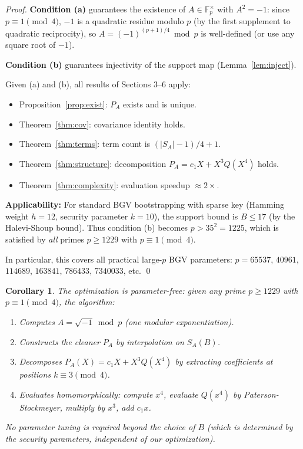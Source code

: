 \documentclass[11pt]{article}
\newtheorem{corollary}[theorem]{Corollary}
\newcommand{\Fp}{\mathbb{F}_p}
\begin{document}
\begin{proof}
\textbf{Condition (a)} guarantees the existence of $A \in \Fp^\times$ with $A^2 = -1$: since $p \equiv 1 \pmod 4$, $-1$ is a quadratic residue modulo $p$ (by the first supplement to quadratic reciprocity), so $A = (-1)^{(p+1)/4} \bmod p$ is well-defined (or use any square root of $-1$).

\textbf{Condition (b)} guarantees injectivity of the support map (Lemma~\ref{lem:inject}).

Given (a) and (b), all results of Sections 3--6 apply:
\begin{itemize}
\item Proposition~\ref{prop:exist}: $P_A$ exists and is unique.
\item Theorem~\ref{thm:cov}: covariance identity holds.
\item Theorem~\ref{thm:terms}: term count is $(|S_A|-1)/4 + 1$.
\item Theorem~\ref{thm:structure}: decomposition $P_A = c_1 X + X^3 Q(X^4)$ holds.
\item Theorem~\ref{thm:complexity}: evaluation speedup $\approx 2\times$.
\end{itemize}

\textbf{Applicability:} For standard BGV bootstrapping with sparse key (Hamming weight $h = 12$, security parameter $k = 10$), the support bound is $B \leq 17$ (by the Halevi-Shoup bound). Thus condition (b) becomes $p > 35^2 = 1225$, which is satisfied by \emph{all} primes $p \geq 1229$ with $p \equiv 1 \pmod 4$.

In particular, this covers all practical large-$p$ BGV parameters: $p = 65537$, $40961$, $114689$, $163841$, $786433$, $7340033$, etc. \qed
\end{proof}

\begin{corollary}
The optimization is \emph{parameter-free}: given any prime $p \geq 1229$ with $p \equiv 1 \pmod 4$, the algorithm:
\begin{enumerate}
\item Computes $A = \sqrt{-1} \bmod p$ (one modular exponentiation).
\item Constructs the cleaner $P_A$ by interpolation on $S_A(B)$.
\item Decomposes $P_A(X) = c_1 X + X^3 Q(X^4)$ by extracting coefficients at positions $k \equiv 3 \pmod 4$.
\item Evaluates homomorphically: compute $x^4$, evaluate $Q(x^4)$ by Paterson-Stockmeyer, multiply by $x^3$, add $c_1 x$.
\end{enumerate}
No parameter tuning is required beyond the choice of $B$ (which is determined by the security parameters, independent of our optimization).
\end{corollary}
\end{document}
